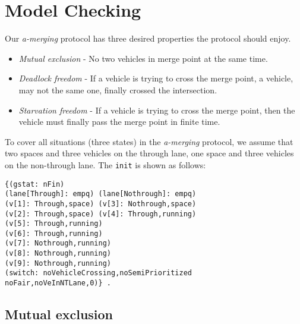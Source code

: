 \documentclass[10pt, conference, compsocconf]{IEEEtran}
\begin{document}




 
\section{Model Checking}
\label{sect_model}
Our \textit{a-merging} protocol has three desired properties the protocol should enjoy.
\begin{itemize}
    \item \textit{Mutual exclusion} - No two vehicles in merge point at the same time.
    \item \textit{Deadlock freedom} - If a vehicle is trying to cross the merge point, a vehicle, may not the same one, finally crossed the intersection.
    \item \textit{Starvation freedom} - If a vehicle is trying to cross the merge point, then the vehicle must finally pass the merge point in finite time.
\end{itemize}

To cover all situations (three states) in the \textit{a-merging} protocol, we assume that two spaces and three vehicles on the through lane, one space and three vehicles on the non-through lane.
The \verb!init! is shown as follows:

\begin{small}
\begin{verbatim}
{(gstat: nFin) 
(lane[Through]: empq) (lane[Nothrough]: empq) 
(v[1]: Through,space) (v[3]: Nothrough,space)
(v[2]: Through,space) (v[4]: Through,running)
(v[5]: Through,running) 
(v[6]: Through,running)
(v[7]: Nothrough,running) 
(v[8]: Nothrough,running)
(v[9]: Nothrough,running)
(switch: noVehicleCrossing,noSemiPrioritized
noFair,noVeInNTLane,0)} .
\end{verbatim}
\end{small}

\subsection{Mutual exclusion}
\end{document}
